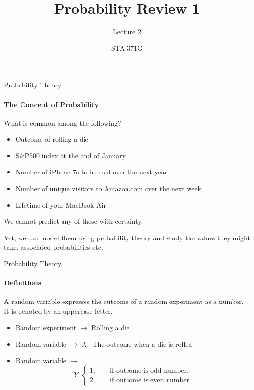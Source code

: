 \documentclass{beamer}\usepackage[]{graphicx}\usepackage[]{color}
\title{Probability Review 1}
\subtitle{Lecture 2}
\author{STA 371G}
\begin{document}
  
  

  \frame{\maketitle}



   \begin{darkframes}
  

    \begin{frame}[label=lists]{Probability Theory}
      \framesubtitle{The Concept of Probability}
      
      What is common among the following? \pause
      
      \begin{itemize}
      	\item Outcome of rolling a die
      	\item S\&P500 index at the and of January
      	\item Number of iPhone 7s to be sold over the next year
      	\item Number of unique visitors to Amazon.com over the next week
      	\item Lifetime of your MacBook Air
      \end{itemize} \pause
      
      We cannot predict any of these with certainty.  \pause
      
      Yet, we can model them using \alert{probability theory} and study the values they might take, associated probabilities etc.
      
     \end{frame}    


    \begin{frame}[label=lists]{Probability Theory}
		\framesubtitle{Definitions}    
		\begin{definition}
       		A \alert{random variable} expresses the outcome of a \alert{random experiment} as a number. It is denoted by an uppercase letter.
      	\end{definition} 	\pause
      	
      		\begin{itemize}
      			\item Random experiment $\rightarrow$ Rolling a die  \pause
      			\item Random variable $\rightarrow$ $X:$ The outcome when a die is rolled  \pause
				\item Random variable $\rightarrow$ $$ Y : \begin{cases}
        					1, \qquad \text{if outcome is odd number,}  \\
        					2, \qquad \text{if outcome is even number}  
        		            \end{cases}
        		      $$ 
        	\end{itemize}	
	

\end{frame}
\end{darkframes}
\end{document}
